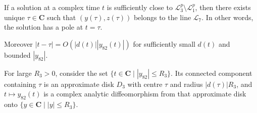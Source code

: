  


 \begin{lemma}\label{lemma:L3}
 If a solution at a complex time $t$ is sufficiently close to  $\mathcal{L}_3^p\setminus\mathcal{L}_1^p$, then there exists unique $\tau\in\mathbf{C}$ such that $(y(\tau),z(\tau))$ belongs to the line $\mathcal{L}_7$.
  In other words, the solution has a pole at $t=\tau$.
  
Moreover
$|t-\tau|=O(|d(t)||y_{82}(t)|)$
 for sufficiently small $d(t)$ and bounded $|y_{82}|$.
 
 For large $R_3>0$, consider the set $\{ t\in\mathbf{C} \mid |y_{82}|\le R_3\}$.
 Its connected component containing $\tau$ is an approximate disk $D_3$ with centre $\tau$ and radius $|d(\tau)|R_3$,
 and $t\mapsto y_{82}(t)$ is a complex analytic diffeomorphism from that approximate disk onto $\{y\in\mathbf{C}\mid|y|\le R_3\}$.
 \end{lemma}
 
